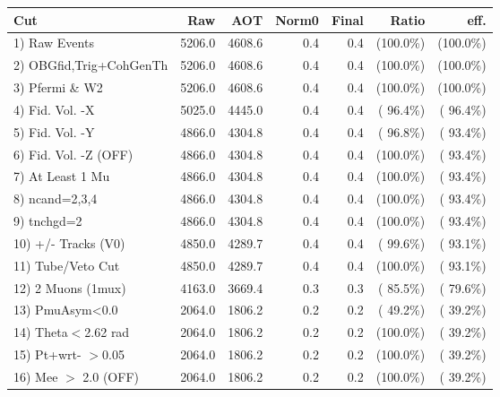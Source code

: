  \begin{table}[h!]\centering
 \begin{tabular}{||l||r|r|r|r|r|r||}
 \hline
 \hline
 Cut & Raw & AOT & Norm0 & Final & Ratio & eff.       \\
 \hline
  1) Raw Events           &       5206.0 &       4608.6 &          0.4 &          0.4 & (100.0\%) & (100.0\%) \\
  2) OBGfid,Trig+CohGenTh &       5206.0 &       4608.6 &          0.4 &          0.4 & (100.0\%) & (100.0\%) \\
  3) Pfermi \& W2         &       5206.0 &       4608.6 &          0.4 &          0.4 & (100.0\%) & (100.0\%) \\
  4) Fid. Vol. -X         &       5025.0 &       4445.0 &          0.4 &          0.4 & ( 96.4\%) & ( 96.4\%) \\
  5) Fid. Vol. -Y         &       4866.0 &       4304.8 &          0.4 &          0.4 & ( 96.8\%) & ( 93.4\%) \\
  6) Fid. Vol. -Z (OFF)   &       4866.0 &       4304.8 &          0.4 &          0.4 & (100.0\%) & ( 93.4\%) \\
  7) At Least 1 Mu        &       4866.0 &       4304.8 &          0.4 &          0.4 & (100.0\%) & ( 93.4\%) \\
  8) ncand=2,3,4          &       4866.0 &       4304.8 &          0.4 &          0.4 & (100.0\%) & ( 93.4\%) \\
  9) tnchgd=2             &       4866.0 &       4304.8 &          0.4 &          0.4 & (100.0\%) & ( 93.4\%) \\
 10) +/- Tracks (V0)      &       4850.0 &       4289.7 &          0.4 &          0.4 & ( 99.6\%) & ( 93.1\%) \\
 11) Tube/Veto Cut        &       4850.0 &       4289.7 &          0.4 &          0.4 & (100.0\%) & ( 93.1\%) \\
 12) 2 Muons (1mux)       &       4163.0 &       3669.4 &          0.3 &          0.3 & ( 85.5\%) & ( 79.6\%) \\
 13) PmuAsym<0.0          &       2064.0 &       1806.2 &          0.2 &          0.2 & ( 49.2\%) & ( 39.2\%) \\
 14) Theta$<$2.62 rad     &       2064.0 &       1806.2 &          0.2 &          0.2 & (100.0\%) & ( 39.2\%) \\
 15) Pt+wrt- $>$0.05      &       2064.0 &       1806.2 &          0.2 &          0.2 & (100.0\%) & ( 39.2\%) \\
 16) Mee $>$ 2.0  (OFF)   &       2064.0 &       1806.2 &          0.2 &          0.2 & (100.0\%) & ( 39.2\%) \\

\end{tabular}
\end{table}
